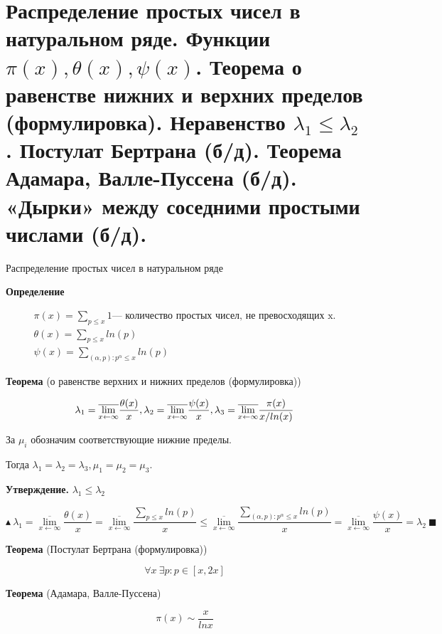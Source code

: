 \section{Распределение простых чисел в натуральном ряде. Функции $\pi(x), \theta(x), \psi(x)$. Теорема о равенстве нижних и верхних пределов (формулировка). Неравенство $\lambda_1 \leq \lambda_2$. Постулат Бертрана (б/д). Теорема Адамара, Валле-Пуссена (б/д). «Дырки» между соседними простыми числами (б/д).}

Распределение простых чисел в натуральном ряде

\textbf{Определение} 

$$
\begin{array}{l} 

\pi(x) = \underset{p \leq x}{\sum} 1 \text{— количество простых чисел, не превосходящих x.}\\
\theta(x) = \underset{p \leq x}{\sum} ln(p)\\
\psi(x) = \underset{(\alpha,p) :p^{\alpha} \leq x}{\sum} ln(p)
\end{array}
$$

\textbf{Теорема} (о равенстве верхних и нижних пределов (формулировка))

$$\lambda_1 = \overline{\lim_{x \leftarrow \infty}} \frac{\theta(x)}{x},\\
\lambda_2 = \overline{\lim_{x \leftarrow \infty}} \frac{\psi(x)}{x},\\
\lambda_3 = \overline{\lim_{x \leftarrow \infty}} \frac{\pi(x)}{x / ln(x)}$$

За $\mu_i$ обозначим соответствующие нижние пределы.

Тогда $\lambda_1 = \lambda_2 = \lambda_3, \mu_1 = \mu_2 = \mu_3$.

\textbf{Утверждение.} $\lambda_1 \leq \lambda_2$

$$\blacktriangle \ \lambda_1 = \overline{\lim_{x \leftarrow \infty}} \frac{\theta(x)}{x} =
\overline{\lim_{x \leftarrow \infty}} \frac{\underset{p \leq x}{\sum} ln(p)}{x} \leq \overline{\lim_{x \leftarrow \infty}} \frac{\underset{(\alpha,p) :p^{\alpha} \leq x}{\sum} ln(p)}{x} = \overline{\lim_{x \leftarrow \infty}} \frac{\psi(x)}{x} = \lambda_2\ \blacksquare$$

\textbf{Теорема} (Постулат Бертрана (формулировка)) 

$$\forall x \ \exists p : p \in [x, 2x]$$

\textbf{Теорема} (Адамара, Валле-Пуссена)

$$\pi(x) \sim \frac{x}{ln x}$$

